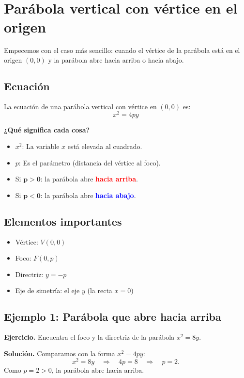 \documentclass[12pt,a4paper]{article}
\begin{document}
	\section{Parábola vertical con vértice en el origen}

	Empecemos con el caso más sencillo: cuando el vértice de la parábola está en el origen \((0,0)\) y la parábola abre hacia arriba o hacia abajo.

	\subsection*{Ecuación}

	La ecuación de una parábola vertical con vértice en \((0,0)\) es:
	\[
	\boxed{x^2=4py}
	\]

	\textbf{¿Qué significa cada cosa?}
	\begin{itemize}
		\item \(x^2\): La variable \(x\) está elevada al cuadrado.
		\item \(p\): Es el parámetro (distancia del vértice al foco).
		\item Si \(\mathbf{p>0}\): la parábola abre \textcolor{red}{\textbf{hacia arriba}}.
		\item Si \(\mathbf{p<0}\): la parábola abre \textcolor{blue}{\textbf{hacia abajo}}.
	\end{itemize}

	\subsection*{Elementos importantes}
	\begin{itemize}
		\item Vértice: \(V(0,0)\)
		\item Foco: \(F(0,p)\)
		\item Directriz: \(y=-p\)
		\item Eje de simetría: el eje \(y\) (la recta \(x=0\))
	\end{itemize}

	\subsection*{Ejemplo 1: Parábola que abre hacia arriba}

	\textbf{Ejercicio.} Encuentra el foco y la directriz de la parábola \(x^2=8y\).

	\bigskip

	\textbf{Solución.} Comparamos con la forma \(x^2=4py\):
	\[
	x^2=8y \quad\Rightarrow\quad 4p=8 \quad\Rightarrow\quad p=2.
	\]
	Como \(p=2>0\), la parábola abre hacia arriba.
\end{document}
